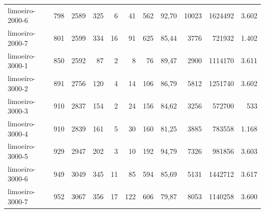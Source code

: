 \begin{table}[ht!]
{\begin{tabular}{lrrrrrrrrrr}
			\rowcolor{rowlight}limoeiro-2000-6                                                     & 798 & 2589 & 325 & 6  & 41  & 562 & 92,70 & 10023 & 1624492 & 3.602 \\
			\rowcolor{rowlight}limoeiro-2000-7                                                     & 801 & 2599 & 334 & 16 & 91  & 625 & 85,44 & 3776  & 721932  & 1.402 \\
			\rowcolor{rowlight}limoeiro-3000-1                                                     & 850 & 2592 & 87  & 2  & 8   & 76  & 89,47 & 2900  & 1114170 & 3.611 \\
			\rowcolor{rowlight}limoeiro-3000-2                                                     & 891 & 2756 & 120 & 4  & 14  & 106 & 86,79 & 5812  & 1251740 & 3.602 \\
			\rowcolor{rowlight}limoeiro-3000-3                                                     & 910 & 2837 & 154 & 2  & 24  & 156 & 84,62 & 3256  & 572700  & 533   \\
			\rowcolor{rowlight}limoeiro-3000-4                                                     & 910 & 2839 & 161 & 5  & 30  & 160 & 81,25 & 3885  & 783558  & 1.168 \\
			\rowcolor{rowlight}limoeiro-3000-5                                                     & 929 & 2947 & 202 & 3  & 10  & 192 & 94,79 & 7326  & 981856  & 3.603 \\
			\rowcolor{rowlight}limoeiro-3000-6                                                     & 949 & 3049 & 345 & 11 & 85  & 594 & 85,69 & 5131  & 1442712 & 3.617 \\
			\rowcolor{rowlight}limoeiro-3000-7                                                     & 952 & 3067 & 356 & 17 & 122 & 606 & 79,87 & 8053  & 1140258 & 3.600 \\
			\bottomrule
		\end{tabular}%
	}
\end{table}

